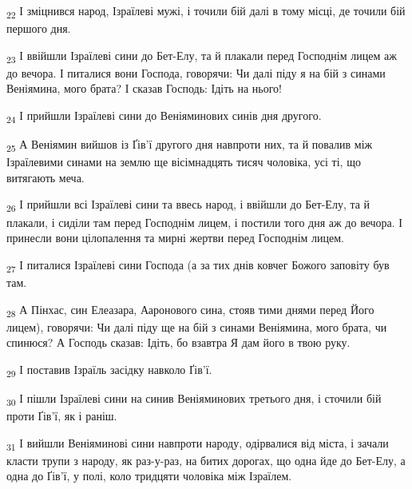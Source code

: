 \begin{tcolorbox}
\textsubscript{22} І зміцнився народ, Ізраїлеві мужі, і точили бій далі в тому місці, де точили бій першого дня.
\end{tcolorbox}
\begin{tcolorbox}
\textsubscript{23} І ввійшли Ізраїлеві сини до Бет-Елу, та й плакали перед Господнім лицем аж до вечора. І питалися вони Господа, говорячи: Чи далі піду я на бій з синами Веніямина, мого брата? І сказав Господь: Ідіть на нього!
\end{tcolorbox}
\begin{tcolorbox}
\textsubscript{24} І прийшли Ізраїлеві сини до Веніяминових синів дня другого.
\end{tcolorbox}
\begin{tcolorbox}
\textsubscript{25} А Веніямин вийшов із Ґів'ї другого дня навпроти них, та й повалив між Ізраїлевими синами на землю ще вісімнадцять тисяч чоловіка, усі ті, що витягають меча.
\end{tcolorbox}
\begin{tcolorbox}
\textsubscript{26} І прийшли всі Ізраїлеві сини та ввесь народ, і ввійшли до Бет-Елу, та й плакали, і сиділи там перед Господнім лицем, і постили того дня аж до вечора. І принесли вони цілопалення та мирні жертви перед Господнім лицем.
\end{tcolorbox}
\begin{tcolorbox}
\textsubscript{27} І питалися Ізраїлеві сини Господа (а за тих днів ковчег Божого заповіту був там.
\end{tcolorbox}
\begin{tcolorbox}
\textsubscript{28} А Пінхас, син Елеазара, Ааронового сина, стояв тими днями перед Його лицем), говорячи: Чи далі піду ще на бій з синами Веніямина, мого брата, чи спинюся? А Господь сказав: Ідіть, бо взавтра Я дам його в твою руку.
\end{tcolorbox}
\begin{tcolorbox}
\textsubscript{29} І поставив Ізраїль засідку навколо Ґів'ї.
\end{tcolorbox}
\begin{tcolorbox}
\textsubscript{30} І пішли Ізраїлеві сини на синив Веніяминових третього дня, і сточили бій проти Ґів'ї, як і раніш.
\end{tcolorbox}
\begin{tcolorbox}
\textsubscript{31} І вийшли Веніяминові сини навпроти народу, одірвалися від міста, і зачали класти трупи з народу, як раз-у-раз, на битих дорогах, що одна йде до Бет-Елу, а одна до Ґів'ї, у полі, коло тридцяти чоловіка між Ізраїлем.
\end{tcolorbox}
